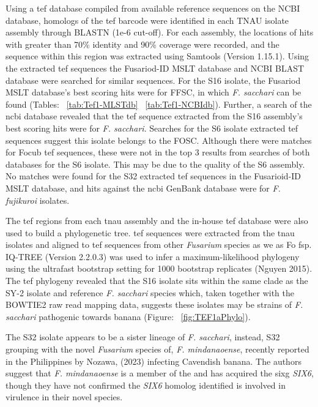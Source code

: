 Using a \ac{tef} database compiled from available reference sequences on the NCBI database, homologs of the \ac{tef} barcode were identified in each TNAU isolate assembly through BLASTN (1e-6 cut-off). For each assembly, the locations of hits with greater than 70\% identity and 90\% coverage were recorded, and the sequence within this region was extracted using Samtools (Version 1.15.1). Using the extracted \ac{tef} sequences the Fusariod-ID MSLT database and NCBI BLAST database were searched for similar sequences. For the S16 isolate, the Fusariod MSLT database's best scoring hits were for \ac{FFSC}, in which \textit{F. sacchari} can be found (Tables: ~\ref{tab:Tef1-MLSTdb} ~\ref{tab:Tef1-NCBIdb}). Further, a search of the \ac{ncbi} database revealed that the \ac{tef} sequence extracted from the S16 assembly's best scoring hits were for \textit{F. sacchari}. Searches for the S6 isolate extracted \ac{tef} sequences suggest this isolate belongs to the \ac{FOSC}. Although there were matches for \ac{Focub} \ac{tef} sequences, these were not in the top 3 results from searches of both databases for the S6 isolate. This may be due to the quality of the S6 assembly. No matches were found for the S32 extracted \ac{tef} sequences in the Fusarioid-ID MSLT database, and hits against the \ac{ncbi} GenBank database were for \textit{F. fujikuroi} isolates. 





The \ac{tef} regions from each \ac{tnau} assembly and the in-house \ac{tef} database were also used to build a phylogenetic tree. \Ac{tef} sequences were extracted from the \ac{tnau} isolates and aligned to \ac{tef} sequences from other \textit{Fusarium} species as we as \ac{Fo} \ac{fsp}. IQ-TREE (Version 2.2.0.3) was used to infer a maximum-likelihood phylogeny using the ultrafast bootstrap setting for 1000 bootstrap replicates (Nguyen 2015). The \ac{tef} phylogeny revealed that the  S16 isolate sits within the same clade as the SY-2 isolate and reference \textit{F. sacchari} species which, taken together with the BOWTIE2 raw read mapping data, suggests these isolates may be strains of \textit{F. sacchari} pathogenic towards banana (Figure: ~\ref{fig:TEF1aPhylo}). 

The S32 isolate appears to be a sister lineage of \textit{F. sacchari}, instead, S32 grouping with the novel \textit{Fusarium} species of, \textit{F. mindanaoense}, recently reported in the Philippines by Nozawa, \et (2023) infecting Cavendish banana. The authors suggest that \textit{F. mindanaoense} is a member of the  and has acquired the \ac{sixg} \textit{SIX6}, though they have not confirmed the \textit{SIX6} homolog identified is involved in virulence in their novel species.

